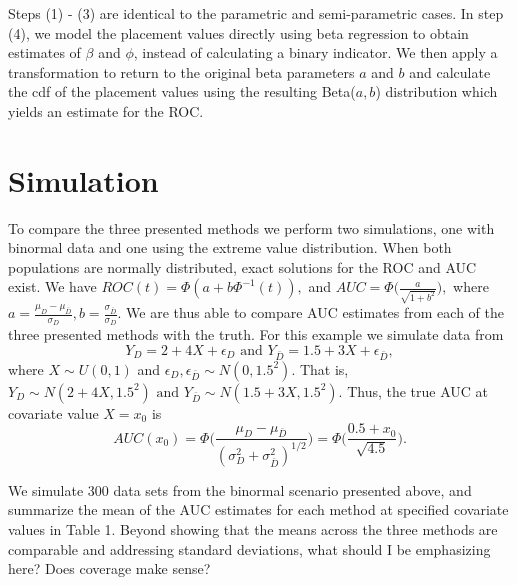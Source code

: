 \documentclass{interact}
\theoremstyle{definition}
\begin{document}
Steps (1) - (3) are identical to the parametric and semi-parametric cases.  In step (4), we model the placement values directly using beta regression to obtain estimates of $\beta$ and $\phi$, instead of calculating a binary indicator.  We then apply a transformation to return to the original beta parameters $a$ and $b$ and calculate the cdf of the placement values using the resulting Beta($a,b$) distribution which yields an estimate for the ROC.

\section{Simulation}

To compare the three presented methods we perform two simulations, one with binormal data and one using the extreme value distribution.  When both populations are normally distributed, exact solutions for the ROC and AUC exist. We have $ROC(t) = {\Phi}(a + b {\Phi}^{-1} (t) ),$ and $ AUC = \Phi \bigg( \frac{a}{\sqrt{1 + b^2}} \bigg),$ where $ a = \frac{\mu_D - \mu_{\bar{D}}}{\sigma_D}, b = \frac{\sigma_{\bar{D}}}{\sigma_D}.$  We are thus able to compare AUC estimates from each of the three presented methods with the truth.  For this example we simulate data from 
$$Y_D = 2 + 4X + \epsilon_D \text{ and } Y_{\bar{D}} = 1.5 + 3X + \epsilon_{\bar{D}},$$ 
where $X \sim U(0,1)$ and $\epsilon_D, \epsilon_{\bar{D}} \sim N(0,1.5^2).$
That is, $Y_D \sim N(2 + 4X, 1.5^2) \text{ and } Y_{\bar{D}} \sim N(1.5 + 3X, 1.5^2).$
Thus, the true AUC at covariate value $X = x_0$ is 
$$AUC(x_0) = \Phi \bigg(\frac{\mu_{D} - \mu_{\bar{D}}}{(\sigma_D^2 + \sigma_{\bar{D}}^2)^{1/2}} \bigg) = \Phi \bigg(\frac{0.5 + x_0}{\sqrt{4.5}}\bigg). $$

We simulate 300 data sets from the binormal scenario presented
above, and summarize the mean of the AUC estimates for each
method at specified covariate values in Table 1. { \color{red} Beyond showing that the means across the three methods are comparable and addressing standard deviations, what should I be emphasizing here?  Does coverage make sense?}\\
\end{document}
